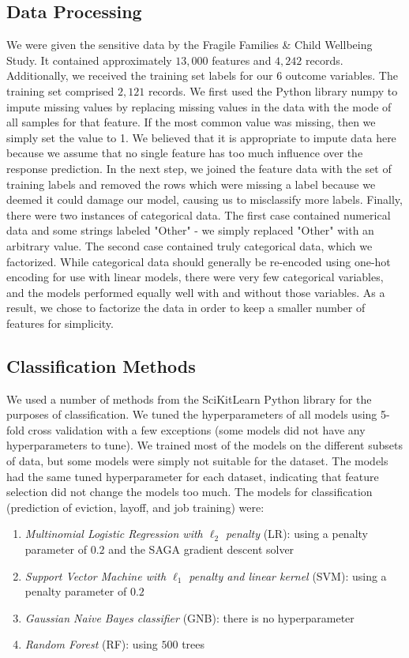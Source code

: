 \documentclass{article} %
\begin{document}
\subsection{Data Processing}

We were given the sensitive data by the Fragile Families \& Child Wellbeing Study. It contained approximately $13,000$ features and $4,242$ records. Additionally, we received the training set labels for our $6$ outcome variables. The training set comprised $2,121$ records. We first used the Python library numpy to impute missing values by replacing missing values in the data with the mode of all samples for that feature. If the most common value was missing, then we simply set the value to 1. We believed that it is appropriate to impute data here because we assume that no single feature has too much influence over the response prediction. In the next step, we joined the feature data with the set of training labels and removed the rows which were missing a label because we deemed it could damage our model, causing us to misclassify more labels. Finally, there were two instances of categorical data. The first case contained numerical data and some strings labeled "Other" - we simply replaced "Other" with an arbitrary value. The second case contained truly categorical data, which we factorized. While categorical data should generally be re-encoded using one-hot encoding for use with linear models, there were very few categorical variables, and the models performed equally well with and without those variables. As a result, we chose to factorize the data in order to keep a smaller number of features for simplicity.

\subsection{Classification Methods} \label{cm}

We used a number of methods from the SciKitLearn Python library \cite{skl} for the purposes of classification. We tuned the hyperparameters of all models using 5-fold cross validation with a few exceptions (some models did not have any hyperparameters to tune). We trained most of the models on the different subsets of data, but some models were simply not suitable for the dataset. The models had the same tuned hyperparameter for each dataset, indicating that feature selection did not change the models too much. The models for classification (prediction of eviction, layoff, and job training) were:
\begin{enumerate}
\item \textit{Multinomial Logistic Regression with $\ell_2$ penalty} (LR): using a penalty parameter of $0.2$ and the SAGA gradient descent solver
\item \textit{Support Vector Machine with $\ell_1$ penalty and linear kernel} (SVM): using a penalty parameter of $0.2$
\item \textit{Gaussian Naive Bayes classifier} (GNB): there is no hyperparameter
\item \textit{Random Forest} (RF): using $500$ trees
\end{enumerate}
\end{document}
